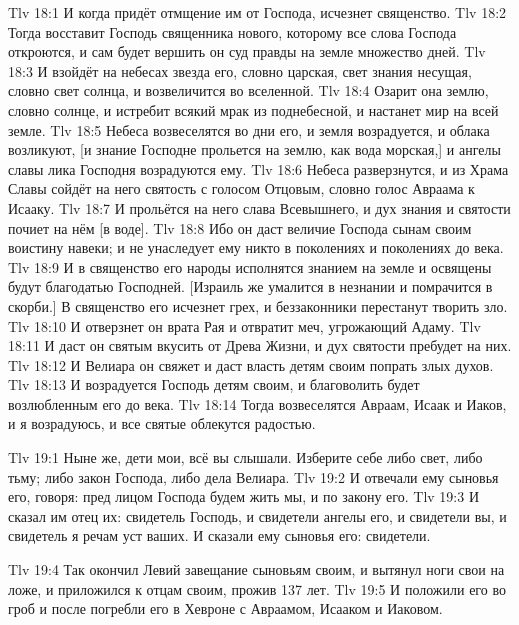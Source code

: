 \vs Tlv 18:1
И когда придёт отмщение им от Господа,
исчезнет священство.
\vs Tlv 18:2
Тогда восставит Господь священника нового,
которому все слова Господа откроются,
и сам будет вершить он суд правды на земле множество дней.
\vs Tlv 18:3
И взойдёт на небесах звезда его, словно царская,
свет знания несущая, словно свет солнца, и возвеличится во вселенной.
\vs Tlv 18:4
Озарит она землю, словно солнце, и истребит всякий мрак из
поднебесной, и настанет мир на всей земле.
\vs Tlv 18:5
Небеса возвеселятся во дни его,
и земля возрадуется, и облака возликуют,
[и знание Господне прольется на землю, как вода морская,]
и ангелы славы лика Господня возрадуются ему.
\vs Tlv 18:6
Небеса разверзнутся, и из Храма Славы сойдёт
на него святость с голосом Отцовым, словно голос Авраама к Исааку.
\vs Tlv 18:7
И прольётся на него слава Всевышнего,
и дух знания и святости почиет на нём [в воде].
\vs Tlv 18:8
Ибо он даст величие Господа сынам своим воистину навеки;
и не унаследует ему никто в поколениях и поколениях до века.
\vs Tlv 18:9
И в священство его народы исполнятся знанием на земле и освящены
будут благодатью Господней.
[Израиль же умалится в незнании и помрачится в скорби.]
В священство его исчезнет грех, и беззаконники перестанут творить зло.
\vs Tlv 18:10
И отверзнет он врата Рая и отвратит меч, угрожающий Адаму.
\vs Tlv 18:11
И даст он святым вкусить от Древа Жизни, и дух святости пребудет на них.
\vs Tlv 18:12
И Велиара он свяжет и даст власть детям своим попрать злых духов.
\vs Tlv 18:13
И возрадуется Господь детям своим, и благоволить будет возлюбленным
его до века.
\vs Tlv 18:14
Тогда возвеселятся Авраам, Исаак и Иаков, и я возрадуюсь,
и все святые облекутся радостью.

\vs Tlv 19:1
Ныне же, дети мои, всё вы слышали.
Изберите себе либо свет, либо тьму;
либо закон Господа, либо дела Велиара.
\vs Tlv 19:2
И отвечали ему сыновья его, говоря:
пред лицом Господа будем жить мы, и по закону его.
\vs Tlv 19:3
И сказал им отец их: свидетель Господь, и свидетели ангелы его,
и свидетели вы, и свидетель я речам уст ваших.
И сказали ему сыновья его: свидетели.

\vs Tlv 19:4
Так окончил Левий завещание сыновьям своим, и вытянул ноги свои на
ложе, и приложился к отцам своим, прожив 137 лет.
\vs Tlv 19:5
И положили его во гроб и после погребли его в Хевроне с
Авраамом, Исааком и Иаковом.
